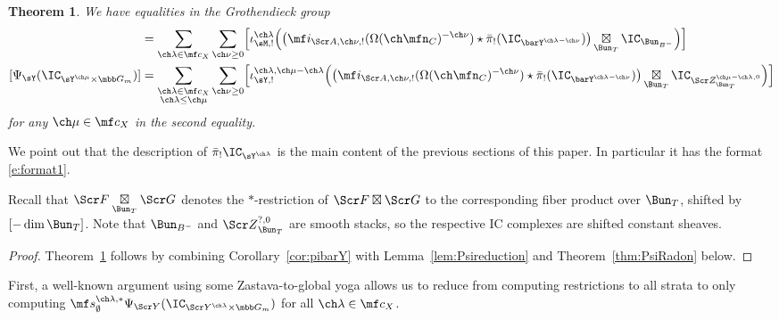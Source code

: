 \documentclass[final]{amsart}
\newtheorem{thm}[subsubsection]{Theorem}
\theoremstyle{remark}
\theoremstyle{definition}
\DeclareMathOperator*{\bt}{\boxtimes}
\numberwithin{equation}{section}
\begin{document}
\begin{thm} \label{thm:nearby}
We have equalities in the Grothendieck group
\begin{align*}
[\Psi_\sM(\IC_{\sM_X \times \mbb G_m})] &= 
\sum_{\ch\lambda\in \mf c_X} \sum_{\ch\nu\ge 0} 
\Bigl[ \iota^{\ch\lambda}_{\sM,!}\Bigl( \bigl(\mf i_{\Scr A,\ch\nu,!}(\Omega(\ch\mfn_C)^{-\ch\nu}) \star \bar\pi_!(\IC_{\barY^{\ch\lambda-\ch\nu}}) \bigr) \bt_{\Bun_T} \IC_{\Bun_{B^-}} \Bigr) \Bigr] \\ 
[\Psi_\sY(\IC_{\sY^{\ch\mu} \times \mbb G_m})] &= 
\sum_{\substack{\ch\lambda\in \mf c_X\\ \ch\lambda \le \ch\mu}} \sum_{\ch\nu\ge 0} 
\Bigl[ \iota^{\ch\lambda,\ch\mu-\ch\lambda}_{\sY,!}\Bigl(\bigl(\mf i_{\Scr A,\ch\nu,!}(\Omega(\ch\mfn_C)^{-\ch\nu}) \star \bar\pi_!(\IC_{\barY^{\ch\lambda-\ch\nu}}) \bigr) \bt_{\Bun_T} \IC_{\Scr Z^{\ch\mu-\ch\lambda,0}_{\Bun_T}} \Bigr) \Bigr] 
\end{align*}
for any $\ch\mu\in \mf c_X$ in the second equality.
\end{thm}


We point out that the description of $\bar\pi_!\IC_{\sY^{\ch\lambda}}$ is 
the main content of the previous sections of this paper. In particular it has the format \eqref{e:format1}. 

Recall that $\Scr F\underset{\Bun_T}\boxtimes \Scr G$ denotes the $*$-restriction of 
$\Scr F\boxtimes \Scr G$ to the corresponding fiber product over $\Bun_T$,
shifted by $[-\dim \Bun_T]$. Note that $\Bun_{B^-}$ and ${\Scr Z}^{?,0}_{\Bun_T}$ are smooth stacks, so the respective IC complexes are shifted constant sheaves. 


\begin{proof}
Theorem~\ref{thm:nearby} follows by combining Corollary~\ref{cor:pibarY} 
with Lemma~\ref{lem:Psireduction} and Theorem~\ref{thm:PsiRadon} below.
\end{proof}


First, a well-known argument using some Zastava-to-global yoga 
allows us to reduce from computing restrictions to all strata to only
computing  
$\mf s^{\ch\lambda,*}_\emptyset \Psi_{\Scr Y}(\IC_{\Scr Y^{\ch\lambda}\times\mbb G_m})$
for all $\ch\lambda\in \mf c_X$. 
\end{document}
